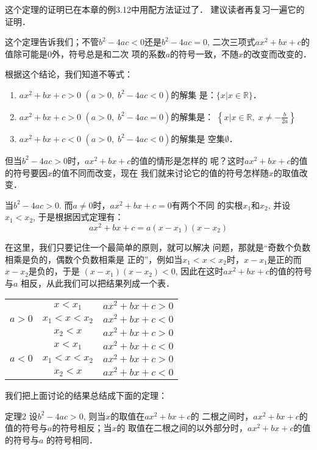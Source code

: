 这个定理的证明已在本章的例3.12中用配方法证过了．
建议读者再复习一遍它的证明．

这个定理告诉我们；不管$b^2-4ac<0$还是$b^2-4ac=0$,
二次三项式$ax^2+bx+c$的值除可能是0外，符号总是和二次
项的系数$a$的符号一致，不随$x$的改变而改变的．

根据这个结论，我们知道不等式：
\begin{enumerate}
    \item $ax^2+bx+c>0$ $(a>0,\; b^2-4ac<0)$的解集
    是：$\{x|x\in\mathbb{R}\}$．
    \item $ax^2+bx+c>0$ $(a>0,\;b^2-4ac=0)$的解集是：
    $\left\{x\Big|x\in\mathbb{R},\; x\ne -\frac{b}{2a}\right\}$
    \item $ax^2+bx+c<0$ $(a>0,\; b^2-4ac<0)$的解集是
    空集$\emptyset$．
\end{enumerate}

但当$b^2-4ac>0$时，$ax^2+bx+c$的值的情形是怎样的
呢？这时$ax^2+bx+c$的值的符号要因$x$的值不同而改变，现在
我们就来讨论它的值的符号怎样随$x$的取值改变．

当$b^2-4ac>0$. 而$a\ne 0$时，$ax^2+bx+c=0$有两个不同
的实根$x_1$和$x_2$, 并设$x_1<x_2$, 于是根据因式定理有：
\[ax^2+bx+c=a(x-x_1)(x-x_2)\]

在这里，我们只要记住一个最简单的原则，就可以解决
问题，那就是“奇数个负数相乘是负的，偶数个负数相乘是
正的”，例如当$x_1<x<x_2$时，$x-x_1$是正的而$x-x_2$是负的，于是
$(x-x_1)(x-x_2)<0$, 因此在这时$ax^2+bx+c$的值的符号与$a$
相反，从此我们可以把结果列成一个表．
\begin{center}
\begin{tabular}{c|c|c}
\hline
      & $x<x_1$ & $ax^2+bx+c>0$\\
 $a>0$   &  $x_1<x<x_2$ & $ax^2+bx+c<0$\\
    &  $x_2<x$ & $ax^2+bx+c>0$\\
\hline
  & $x<x_1$ & $ax^2+bx+c<0$\\
$a<0$&  $x_1<x<x_2$ & $ax^2+bx+c>0$\\
&  $x_2<x$ & $ax^2+bx+c<0$\\
\hline
\end{tabular}
\end{center}

我们把上面讨论的结果总结成下面的定理：
\begin{blk}{定理2}
    设$b^2-4ac>0$, 则当$x$的取值在$ax^2+bx+c$的
    二根之间时，$ax^2+bx+c$的值的符号与$a$的符号相反；当$x$的
    取值在二根之间的以外部分时，$ax^2+bx+c$的值的符号与$a$
    的符号相同． 
\end{blk}

